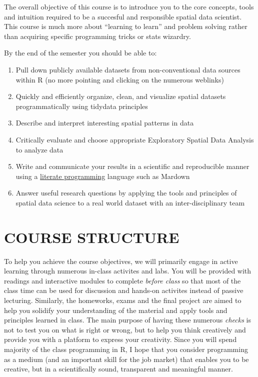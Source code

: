\documentclass[11pt,]{article}
\begin{document}
The overall objective of this course is to introduce you to the core
concepts, tools and intuition required to be a succesful and responsible
spatial data scientist. This course is much more about ``learning to
learn'' and problem solving rather than acquiring specific programming
tricks or stats wizardry.

By the end of the semester you should be able to:

\begin{enumerate}
\def\labelenumi{\arabic{enumi}.}
\item
  Pull down publicly available datasets from non-conventional data
  sources within R (no more pointing and clicking on the numerous
  weblinks)
\item
  Quickly and efficiently organize, clean, and visualize spatial
  datasets programmatically using tidydata principles
\item
  Describe and interpret interesting spatial patterns in data
\item
  Critically evaluate and choose appropriate Exploratory Spatial Data
  Analysis to analyze data
\item
  Write and communicate your results in a scientific and reproducible
  manner using a
  \href{http://ross.net/funnelweb/tutorial/intro_what.html}{literate
  programming} language such as Mardown
\item
  Answer useful research questions by applying the tools and principles
  of spatial data science to a real world dataset with an
  inter-disciplinary team
\end{enumerate}

\hypertarget{course-structure}{%
\section{COURSE STRUCTURE}\label{course-structure}}

To help you achieve the course objectives, we will primarily engage in
active learning through numerous in-class activites and labs. You will
be provided with readings and interactive modules to complete
\emph{before class} so that most of the class time can be used for
discussion and hands-on activites instead of passive lecturing.
Similarly, the homeworks, exams and the final project are aimed to help
you solidify your understanding of the material and apply tools and
principles learned in class. The main purpose of having these numerous
\emph{checks} is not to test you on what is right or wrong, but to help
you think creatively and provide you with a platform to express your
creativity. Since you will spend majority of the class programming in R,
I hope that you consider programming as a medium (and an important skill
for the job market) that enables you to be creative, but in a
scientifically sound, transparent and meaningful manner.
\end{document}
